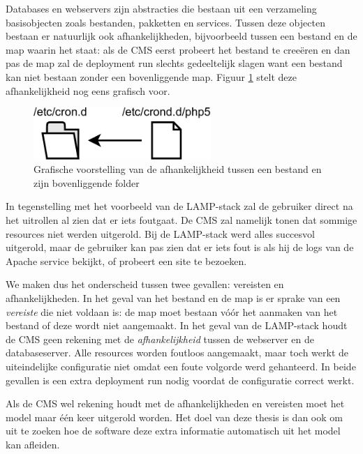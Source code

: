 Databases en webservers zijn abstracties die bestaan uit een verzameling basisobjecten zoals bestanden, pakketten en services.
Tussen deze objecten bestaan er natuurlijk ook afhankelijkheden, bijvoorbeeld tussen een bestand en de map waarin het staat:
als de CMS eerst probeert het bestand te cree\"eren en dan pas de map zal de deployment run slechts gedeeltelijk slagen want een bestand kan niet bestaan
zonder een bovenliggende map.
Figuur \ref{fig:file_dir_dep} stelt deze afhankelijkheid nog eens grafisch voor.
\begin{figure}
    \begin{center}
    \includegraphics[width=0.6\textwidth]{images/file_dir_dep.pdf}
    \caption{Grafische voorstelling van de afhankelijkheid tussen een bestand en zijn bovenliggende folder}
    \label{fig:file_dir_dep}
    \end{center}
\end{figure}
In tegenstelling met het voorbeeld van de LAMP-stack zal de gebruiker direct na het uitrollen al zien dat er iets foutgaat.
De CMS zal namelijk tonen dat sommige resources niet werden uitgerold.
Bij de LAMP-stack werd alles succesvol uitgerold, maar de gebruiker kan pas zien dat er iets fout is als hij de logs van de Apache service bekijkt, of probeert een site te bezoeken.

We maken dus het onderscheid tussen twee gevallen: vereisten en afhankelijkheden.
In het geval van het bestand en de map is er sprake van een \textit{vereiste} die niet voldaan is: de map moet bestaan v\'o\'or het aanmaken van het bestand of deze wordt niet aangemaakt.
In het geval van de LAMP-stack houdt de CMS geen rekening met de \textit{afhankelijkheid} tussen de webserver en de databaseserver.
Alle resources worden foutloos aangemaakt, maar toch werkt de uiteindelijke configuratie niet omdat een foute volgorde werd gehanteerd.
In beide gevallen is een extra deployment run nodig voordat de configuratie correct werkt.

Als de CMS wel rekening houdt met de afhankelijkheden en vereisten moet het model maar \'e\'en keer uitgerold worden.
Het doel van deze thesis is dan ook om uit te zoeken hoe de software deze extra informatie automatisch uit het model kan afleiden.

